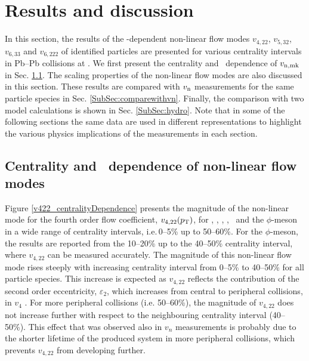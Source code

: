 \newpage

\section{Results and discussion}
\label{Sec:Results}

In this section, the results of the \pT-dependent non-linear flow modes $v_{4,22}$, $v_{5,32}$, $v_{6,33}$ and $v_{6,222}$ of identified particles are presented for various centrality intervals in Pb--Pb collisions at \sNN. We first present the centrality and \pT~dependence of $v_{\rm n,mk}$ in Sec. \ref{SubSec:pTdependence}. The scaling properties of the non-linear flow modes are also discussed in this section. These results are compared with $v_{\rm n}$ measurements for the same particle species in Sec. \ref{SubSec:comparewithvn}. Finally, the comparison with two model calculations is shown in Sec. \ref{SubSec:hydro}. Note that in some of the following sections the same data are used in different representations to highlight the various physics implications of the measurements in each section.

\subsection{Centrality and \pT~dependence of non-linear flow modes}
\label{SubSec:pTdependence}

Figure \ref{v422_centralityDependence} presents the magnitude of the non-linear mode for the fourth order flow coefficient, $v_{4,22}(p_{\rm{T}})$, for \pion, \kaon, \Ks, \proton, \lambdas~and the $\phi$-meson in a wide range of centrality intervals, i.e.\,0--5\% up to 50--60\%. For the $\phi$-meson, the results are reported from the 10--20\% up to the 40--50\% centrality interval, where $v_{4,22}$ can be measured accurately. The magnitude of this non-linear flow mode rises steeply with increasing centrality interval from 0--5\% to 40--50\% for all particle species. This increase is expected as $v_{4,22}$ reflects the contribution of the second order eccentricity, $\varepsilon_{2}$, which increases from central to peripheral collisions, in $v_{4}$ \cite{Alver:2010gr, Acharya:2017zfg}. For more peripheral collisions (i.e. 50--60\%), the magnitude of $v_{4,22}$ does not increase further with respect to the neighbouring centrality interval (40--50\%). This effect that was observed also in $v_n$ measurements \cite{Abelev:2014pua,Acharya:2018zuq} is probably due to the shorter lifetime of the produced system in more peripheral collisions, which prevents $v_{4,22}$ from developing further. 


